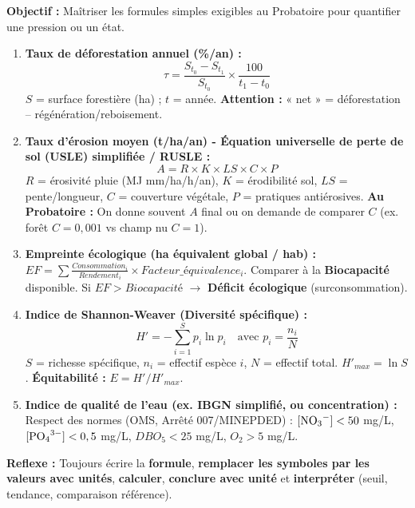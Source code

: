 \documentclass[11pt]{article}
\begin{document}
\begin{methode}
    \textbf{Objectif :} Maîtriser les formules simples exigibles au Probatoire pour quantifier une pression ou un état.
    \begin{enumerate}
        \item \textbf{Taux de déforestation annuel (\%/an) :}
        \[ \tau = \frac{S_{t_0} - S_{t_1}}{S_{t_0}} \times \frac{100}{t_1 - t_0} \]
        $S$ = surface forestière (ha) ; $t$ = année. \textbf{Attention :} « net » = déforestation – régénération/reboisement.
        \item \textbf{Taux d'érosion moyen (t/ha/an) - Équation universelle de perte de sol (USLE) simplifiée / RUSLE :}
        \[ A = R \times K \times LS \times C \times P \]
        $R$ = érosivité pluie (MJ mm/ha/h/an), $K$ = érodibilité sol, $LS$ = pente/longueur, $C$ = couverture végétale, $P$ = pratiques antiérosives.
        \textbf{Au Probatoire :} On donne souvent $A$ final ou on demande de comparer $C$ (ex. forêt $C=0,001$ vs champ nu $C=1$).
        \item \textbf{Empreinte écologique (ha équivalent global / hab) :} $EF = \sum \frac{Consommation_i}{Rendement_i} \times Facteur\_équivalence_i$. Comparer à la \textbf{Biocapacité} disponible. Si $EF > Biocapacité$ $\rightarrow$ \textbf{Déficit écologique} (surconsommation).
        \item \textbf{Indice de Shannon-Weaver (Diversité spécifique) :}
        \[ H' = -\sum_{i=1}^{S} p_i \ln p_i \quad \text{avec } p_i = \frac{n_i}{N} \]
        $S$ = richesse spécifique, $n_i$ = effectif espèce $i$, $N$ = effectif total. $H'_{max} = \ln S$. \textbf{Équitabilité :} $E = H' / H'_{max}$.
        \item \textbf{Indice de qualité de l'eau (ex. IBGN simplifié, ou concentration) :} Respect des normes (OMS, Arrêté 007/MINEPDED) : $[\ce{NO3-}] < 50$ mg/L, $[\ce{PO4^3-}] < 0,5$ mg/L, $DBO_5 < 25$ mg/L, $O_2 > 5$ mg/L.
    \end{enumerate}
    \textbf{Reflexe :} Toujours écrire la \textbf{formule}, \textbf{remplacer les symboles par les valeurs avec unités}, \textbf{calculer}, \textbf{conclure avec unité} et \textbf{interpréter} (seuil, tendance, comparaison référence).
\end{methode}
\end{document}
